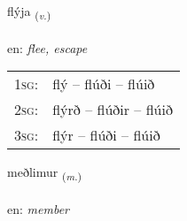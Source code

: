 \documentclass[frontgrid, backgrid]{flacards}\usepackage[]{graphicx}\usepackage[]{xcolor}
\begin{document}
\renewcommand{\flhead}{\vskip5pt \fboxsep=0pt {\small\bfseries\footnotesize Sagnorð | Verb}}
\renewcommand{\fcfoot}{\vskip5pt \fboxsep=0pt \hspace{2pt}{\small\bfseries\footnotesize 3K}}

\renewcommand{\blhead}{\vskip5pt {\small\bfseries\footnotesize Sagnorð | Verb }}
\renewcommand{\bcfoot}{\vskip5pt \hspace{2pt}{\small\bfseries\footnotesize 3K}}


{flýja \small{\textsubscript{(\textit{v.})}} \\[1ex] %
\textphonetic{[fliːja]} \\
en: \emph{flee, escape} \\  [2ex]
\renewcommand*{\arraystretch}{0.8}
\begin{tabular}{p{1cm}l}
\textsc{1sg}: & flý -- flúði -- flúið \\ 
\textsc{2sg}: & flýrð -- flúðir -- flúið \\ 
\textsc{3sg}: & flýr -- flúði -- flúið \\ 
\end{tabular}
}

\renewcommand{\flhead}{\vskip5pt \fboxsep=0pt {\small\bfseries\footnotesize Nafnorð | Noun}}
\renewcommand{\fcfoot}{\vskip5pt \fboxsep=0pt \hspace{2pt}{\small\bfseries\footnotesize 3K}}

\renewcommand{\blhead}{\vskip5pt {\small\bfseries\footnotesize Nafnorð | Noun }}
\renewcommand{\bcfoot}{\vskip5pt \hspace{2pt}{\small\bfseries\footnotesize 3K}}


{meðlimur \small{\textsubscript{(\textit{m.})}} \\[1ex] %
\textphonetic{[mɛðlɪmʏr]} \\
en: \emph{member} \\  [2ex]
\renewcommand*{\arraystretch}{0.8}
}
\end{document}
